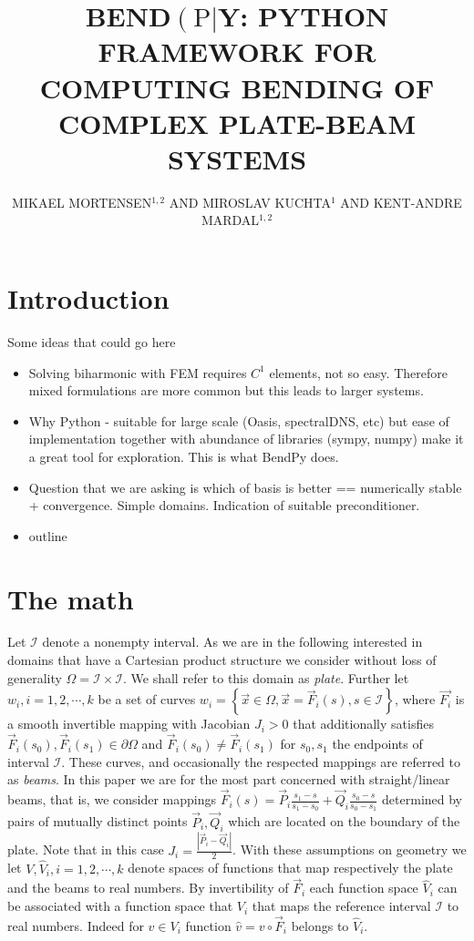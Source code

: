 \documentclass{marine_2015}
\title{
  BEND$\left(\text{P}\right|$Y: PYTHON FRAMEWORK FOR COMPUTING BENDING OF COMPLEX PLATE-BEAM SYSTEMS
}
\author{MIKAEL MORTENSEN$^{1, 2}$ AND MIROSLAV KUCHTA$^{1}$ AND KENT-ANDRE MARDAL$^{1, 2}$ }
\begin{document}
\section{Introduction}
Some ideas that could go here
\begin{itemize}
  \item Solving biharmonic with FEM requires $C^1$ elements, not so easy.
    Therefore mixed formulations are more common but this leads to larger
    systems.
  \item Why Python - suitable for large scale (Oasis, spectralDNS, etc) but ease
    of implementation together with abundance of libraries (sympy, numpy) make
    it a great tool for exploration. This is what BendPy does.
  \item Question that we are asking is which of basis is better == numerically
    stable + convergence. Simple domains. Indication of suitable preconditioner.
  \item outline
\end{itemize}

\section{The math}
Let $\mathcal{I}$ denote a nonempty interval. As we are in the following
interested in domains that have a Cartesian product structure we consider without
loss of generality $\Omega=\mathcal{I}\times\mathcal{I}$. We shall refer to this
domain as \textit{plate}. Further let $w_i, i=1, 2,\cdots, k$ be a set of curves 
$w_i=\left\{\vec{x}\in\Omega, \vec{x}=\vec{F}_i\left(s\right),
s\in\mathcal{I}\right\}$, where $\vec{F_i}$ is a smooth invertible mapping with
Jacobian $J_i>0$ that additionally satisfies $\vec{F}_i\left(s_0\right),
\vec{F}_i\left(s_1\right)\in\partial\Omega$ and
$\vec{F}_i\left(s_0\right) \neq \vec{F}_i\left(s_1\right)$ for $s_0, s_1$ the
endpoints of interval $\mathcal{I}$. These curves, and occasionally the
respected mappings are referred to as \textit{beams}. In this paper we are for the
most part concerned with straight/linear beams, that is, we consider mappings
$\vec{F}_i\left(s\right)=\vec{P}_i\tfrac{s_1-s}{s_1-s_0}+\vec{Q}_i\tfrac{s_0-s}{s_0-s_1}$
determined by pairs of mutually distinct points $\vec{P}_i, \vec{Q}_i$ which
are located on the boundary of the plate. Note that in this case
$J_i=\tfrac{\left|\vec{P}_i-\vec{Q}_i\right|}{2}$.
%
%
%
With these assumptions on geometry we let $V, \hat{V}_i, i=1, 2, \cdots, k$ denote
spaces of functions that map respectively the plate and the beams to real
numbers. By invertibility of $\vec{F}_i$ each function space $\hat{V}_i$ can be
associated with a function space that $V_{i}$ that maps the reference interval
$\mathcal{I}$ to real numbers. Indeed for $v\in V_i$ function
$\hat{v}=v\circ\vec{F}_i$ belongs to $\hat{V}_i$.
\end{document}
